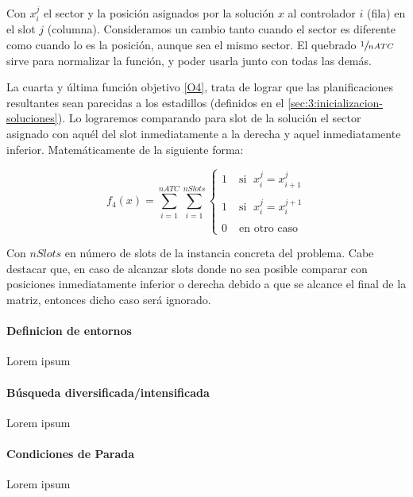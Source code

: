 Con $x_i^j$ el sector y la posición asignados por la solución $x$ al controlador $i$ (fila) en el slot $j$ (columna). Consideramos un cambio tanto cuando el sector es diferente como cuando lo es la posición, aunque sea el mismo sector.
El quebrado $\sfrac{1}{nATC}$ sirve para normalizar la función, y poder usarla junto con todas las demás. 

La cuarta y última función objetivo \ref{O4}, trata de lograr que las planificaciones resultantes sean parecidas a los estadillos (definidos en el \autoref{sec:3:inicializacion-soluciones}). Lo lograremos comparando para slot de la solución el sector asignado con aquél del slot inmediatamente a la derecha y aquel inmediatamente inferior. Matemáticamente de la siguiente forma:

\[
	f_4(x) = \sum_{i=1}^{nATC} \sum_{i=1}^{nSlots}
	\begin{cases}
		1 & \; \textrm{si } \; x_i^j = x_{i+1}^{j} \\
													\\
		1 & \; \textrm{si } \; x_i^j = x_{i}^{j+1}   \\
													  \\
		0 & \; \textrm{en otro caso } 
	\end{cases}
\]

Con $nSlots$ en número de slots de la instancia concreta del problema. Cabe destacar que, en caso de alcanzar slots
donde no sea posible comparar con posiciones inmediatamente inferior o derecha debido a que se alcance el final de la matriz, entonces dicho caso será ignorado.

\paragraph{Definicion de entornos}
Lorem ipsum

\paragraph{Búsqueda diversificada/intensificada} \label{capitulo:3:busqueda-divers-intens}
Lorem ipsum

\paragraph{Condiciones de Parada}
\label{apartado:condiciones-parada}
Lorem ipsum










